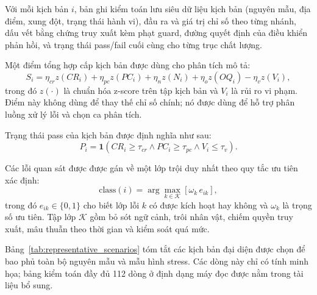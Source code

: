 ﻿\documentclass[a4paper,12pt]{article}
\newcommand{\ind}{\mathbf{1}}
\begin{document}
Với mỗi kịch bản $i$, bản ghi kiểm toán lưu siêu dữ liệu kịch bản (nguyên mẫu, địa điểm, xung đột, trạng thái hành vi), đầu ra và giá trị chỉ số theo từng nhánh, dấu vết bằng chứng truy xuất kèm phạt guard, đường quyết định của điều khiển phản hồi, và trạng thái pass/fail cuối cùng cho từng trục chất lượng.

Một điểm tổng hợp cấp kịch bản được dùng cho phân tích mô tả:
\begin{equation}
S_i = \eta_{cr} z(CR_i) + \eta_{pc} z(PC_i) + \eta_n z(N_i) + \eta_o z(OQ_i) - \eta_v z(V_i),
\end{equation}
trong đó $z(\cdot)$ là chuẩn hóa z-score trên tập kịch bản và $V_i$ là rủi ro vi phạm. Điểm này không dùng để thay thế chỉ số chính; nó được dùng để hỗ trợ phân luồng xử lý lỗi và chọn ca phân tích.

Trạng thái pass của kịch bản được định nghĩa như sau:
\begin{equation}
P_i = \ind\!\left(CR_i\ge\tau_{cr} \land PC_i\ge\tau_{pc} \land V_i\le\tau_v\right).
\end{equation}

Các lỗi quan sát được được gán về một lớp trội duy nhất theo quy tắc ưu tiên xác định:
\begin{equation}
\text{class}(i)=\arg\max_{k\in\mathcal{K}}\left[\omega_k\,e_{ik}\right],
\end{equation}
trong đó $e_{ik}\in\{0,1\}$ cho biết lớp lỗi $k$ có được kích hoạt hay không và $\omega_k$ là trọng số ưu tiên. Tập lớp $\mathcal{K}$ gồm bỏ sót ngữ cảnh, trôi nhân vật, chiếm quyền truy xuất, mâu thuẫn theo thời gian và kiểm soát quá mức.

Bảng~\ref{tab:representative_scenarios} tóm tắt các kịch bản đại diện được chọn để bao phủ toàn bộ nguyên mẫu và mẫu hình stress. Các dòng này chỉ có tính minh họa; bảng kiểm toán đầy đủ 112 dòng ở định dạng máy đọc được nằm trong tài liệu bổ sung.
\end{document}
